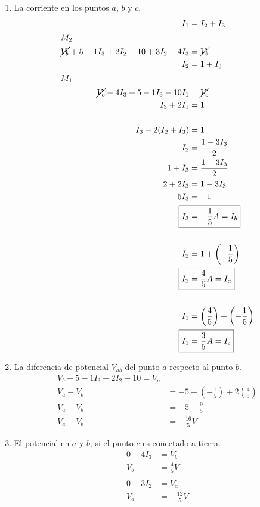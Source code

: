 \documentclass[../main.tex]{subfiles}
\begin{document}
\begin{enumerate}[label=\alph*.]
	\item La corriente en los puntos $a$, $b$ y $c$.
		\begin{align*}
			I_1 &= I_2 + I_3\\
			\intertext{$M_2$}
			\cancel{V_b} + 5 - 1I_3 + 2I_2 -10 + 3I_2 - 4I_3 &= \cancel{V_b}\\
			I_2 &= 1 + I_3\\
			\intertext{$M_1$}
			\cancel{V_c} - 4I_3 + 5 - 1I_3 - 10I_1 &= \cancel{V_c}\\
			I_3 + 2I_1 &= 1\\
			\\
			I_3 +2(I_2+I_3) &= 1\\
			I_2 &= \frac{1-3I_3}{2}\\
			1+ I_3 &= \frac{1-3I_3}{2}\\
			2 + 2I_3 &= 1 - 3I_3\\
			5I_3 &= -1\\
			\Aboxed
			{
				I_3 &= -\frac{1}{5}A = I_b
			}\\
			\\
			I_2 &= 1 + \left(- \frac{1}{5} \right)\\
			\Aboxed
			{
				I_2 &= \frac{4}{5}A = I_a
			}\\
			\\
			I_1 &= \left( \frac{4}{5} \right) + \left( - \frac{1}{5}  \right)\\
			\Aboxed
			{
				I_1 &= \frac{3}{5}A = I_c
			}
		\end{align*}
	\item La diferencia de potencial $V_{ab}$ del punto $a$ respecto al
		punto $b$.
		\begin{align*}
			V_b + 5 - 1I_3 + 2I_2 - 10 = V_a\\
			V_a - V_b &= -5 - \left( -\frac{1}{5} \right) +
			2 \left( \frac{4}{5} \right)\\
			V_a - V_b &= -5 + \frac{9}{5}\\
			V_a - V_b &= -\frac{16}{5}V
		\end{align*}
	\item El potencial en $a$ y $b$, si el punto $c$ es conectado a tierra.
		\begin{align*}
			0 - 4I_3 &= V_b\\
			V_b &= \frac{4}{5} V\\
			\\
			0 - 3I_2 &= V_a\\
			V_a &= - \frac{12}{5} V
		\end{align*}
\end{enumerate}
\end{document}
